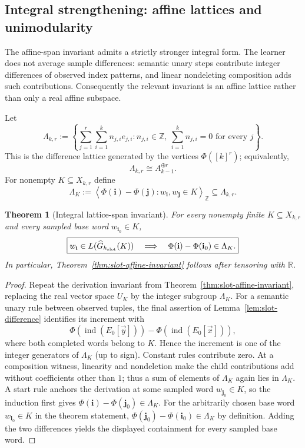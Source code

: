 \documentclass[11pt]{article}
\newtheorem{theorem}[definition]{Theorem}
\begin{document}
\subsection{Integral strengthening: affine lattices and unimodularity}
\label{subsec:lattice-locking}

The affine-span invariant admits a strictly stronger integral form.  The
learner does not average sample differences: semantic unary steps contribute
integer differences of observed index patterns, and linear nondeleting
composition adds such contributions.  Consequently the relevant invariant is
an affine lattice rather than only a real affine subspace.

Let
\[
 \Lambda_{k,r}
 :=
 \left\{
   \sum_{j=1}^r\sum_{i=1}^k n_{j,i}e_{j,i}
   : n_{j,i}\in\mathbb Z,\
     \sum_{i=1}^k n_{j,i}=0\text{ for every }j
 \right\}.
\]
This is the difference lattice generated by the vertices
$\Phi([k]^r)$; equivalently,
\[
 \Lambda_{k,r}\cong A_{k-1}^{\oplus r}.
\]
For nonempty $K\subseteq X_{k,r}$ define
\[
 \Lambda_K
 :=
 \left\langle
   \Phi(\mathbf i)-\Phi(\mathbf j)
   :w_{\mathbf i},w_{\mathbf j}\in K
 \right\rangle_{\mathbb Z}
 \subseteq \Lambda_{k,r}.
\]

\begin{theorem}[Integral lattice-span invariant]
\label{thm:slot-lattice-invariant}
For every nonempty finite $K\subseteq X_{k,r}$ and every sampled base word
$w_{\mathbf i_0}\in K$,
\[
 \boxed{
 w_{\mathbf i}\in L(\widehat G_{h_{\rm slot}}(K))
 \quad\Longrightarrow\quad
 \Phi(\mathbf i)-\Phi(\mathbf i_0)\in\Lambda_K.
 }
\]
In particular, Theorem~\ref{thm:slot-affine-invariant} follows after tensoring
with $\mathbb R$.
\end{theorem}

\begin{proof}
Repeat the derivation invariant from
Theorem~\ref{thm:slot-affine-invariant}, replacing the real vector space
$U_K$ by the integer subgroup $\Lambda_K$.
For a semantic unary rule between observed tuples, the final assertion of
Lemma~\ref{lem:slot-difference} identifies its increment with
\[
 \Phi(\operatorname{ind}(E_0[\vec y]))
 -\Phi(\operatorname{ind}(E_0[\vec x])),
\]
where both completed words belong to $K$.  Hence the increment is one of the
integer generators of $\Lambda_K$ (up to sign).  Constant rules contribute
zero.  At a composition witness, linearity and nondeletion
make the child contributions add without coefficients other than $1$; thus a
sum of elements of $\Lambda_K$ again lies in $\Lambda_K$.  A start rule anchors the derivation at some sampled word
$w_{\mathbf j_0}\in K$, so the induction first gives
$\Phi(\mathbf i)-\Phi(\mathbf j_0)\in\Lambda_K$.  For the arbitrarily
chosen base word $w_{\mathbf i_0}\in K$ in the theorem statement,
$\Phi(\mathbf j_0)-\Phi(\mathbf i_0)\in\Lambda_K$ by definition.
Adding the two differences yields the displayed containment for every sampled
base word.
\end{proof}
\end{document}
